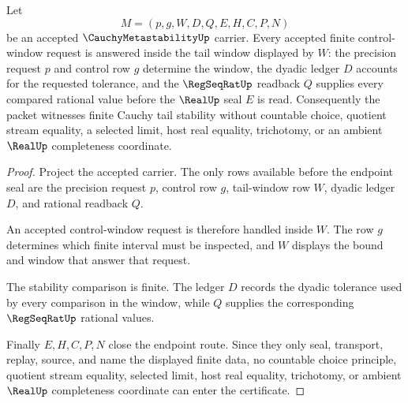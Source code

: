\begin{theorem}\label{thm:cauchy-metastability-finite-tail-stability}
Let
$$
M=(p,g,W,D,Q,E,H,C,P,N)
$$
be an accepted $\CauchyMetastabilityUp$ carrier. Every accepted finite control-window request is answered inside the tail window displayed by $W$: the precision request $p$ and control row $g$ determine the window, the dyadic ledger $D$ accounts for the requested tolerance, and the $\RegSeqRatUp$ readback $Q$ supplies every compared rational value before the $\RealUp$ seal $E$ is read. Consequently the packet witnesses finite Cauchy tail stability without countable choice, quotient stream equality, a selected limit, host real equality, trichotomy, or an ambient $\RealUp$ completeness coordinate.
\end{theorem}
\begin{proof}
Project the accepted carrier. The only rows available before the endpoint seal are the precision request $p$, control row $g$, tail-window row $W$, dyadic ledger $D$, and rational readback $Q$.

An accepted control-window request is therefore handled inside $W$. The row $g$ determines which finite interval must be inspected, and $W$ displays the bound and window that answer that request.

The stability comparison is finite. The ledger $D$ records the dyadic tolerance used by every comparison in the window, while $Q$ supplies the corresponding $\RegSeqRatUp$ rational values.

Finally $E,H,C,P,N$ close the endpoint route. Since they only seal, transport, replay, source, and name the displayed finite data, no countable choice principle, quotient stream equality, selected limit, host real equality, trichotomy, or ambient $\RealUp$ completeness coordinate can enter the certificate.
\end{proof}

